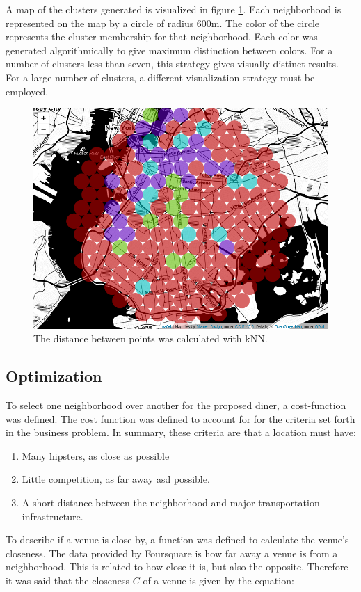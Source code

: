 \documentclass[12pt]{article}
\begin{document}
	A map of the clusters generated is visualized in figure \ref{fig:cluster}.
	Each neighborhood is represented on the map by a circle of radius 600m.
	The color of the circle represents the cluster membership for that neighborhood.
	Each color was generated algorithmically to give maximum distinction between colors.
	For a number of clusters less than seven, this strategy gives visually distinct results.
	For a large number of clusters, a different visualization strategy must be employed.
\begin{figure}[H]
  \includegraphics[width=6.5in]{cluster.png}
  \caption{The distance between points was calculated with kNN.}
  \label{fig:cluster}
\end{figure}
\subsection{Optimization}
	To select one neighborhood over another for the proposed diner, a cost-function was defined.
	The cost function was defined to account for for the criteria set forth in the business problem.
	In summary, these criteria are that a location must have:
\begin{enumerate}[noitemsep]
	\item Many hipsters, as close as possible
	\item Little competition, as far away asd possible.
	\item A short distance between the neighborhood and major transportation infrastructure.
\end{enumerate}
	To describe if a venue is close by, a function was defined to calculate the venue's closeness.
	The data provided by Foursquare is how far away a venue is from a neighborhood.
	This is related to how close it is, but also the opposite.
	Therefore it was said that the closeness $C$ of a venue is given by the equation:\\
\end{document}
